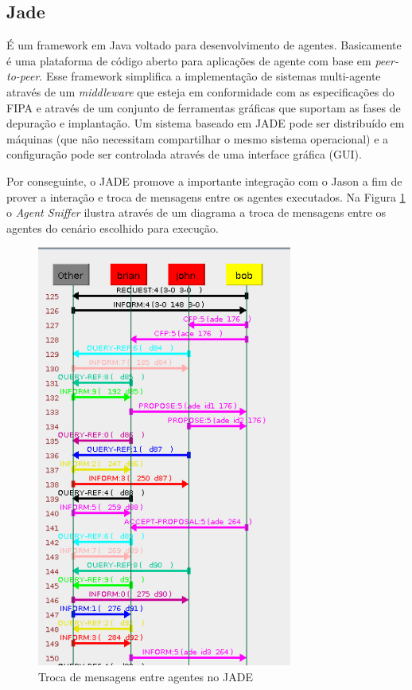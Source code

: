 \documentclass[conference]{IEEEtran}
\begin{document}
        \subsection{Jade}
        É um framework em Java voltado para desenvolvimento de agentes. Basicamente é uma plataforma de código aberto para aplicações de agente com base em \textit{peer-to-peer}. Esse framework simplifica a implementação de sistemas multi-agente através de um \textit{middleware} que esteja em conformidade com as especificações do FIPA e através de um conjunto de ferramentas gráficas que suportam as fases de depuração e implantação. Um sistema baseado em JADE pode ser distribuído em máquinas (que não necessitam compartilhar o mesmo sistema operacional) e a configuração pode ser controlada através de uma interface gráfica (GUI). %
        
        Por conseguinte, o JADE promove a importante integração com o Jason a fim de prover a interação e troca de mensagens entre os agentes executados. Na Figura \ref{fig:snifer} o \textit{Agent Sniffer} ilustra  através de um diagrama a troca de mensagens entre os agentes do cenário escolhido para execução.
        
		 \begin{figure}[ht]
            \begin{center}
                \includegraphics[width=3.3in]{snifer}
            \end{center}
            \caption{Troca de mensagens entre agentes no JADE}
            \label{fig:snifer}
        \end{figure}      
        
\end{document}
